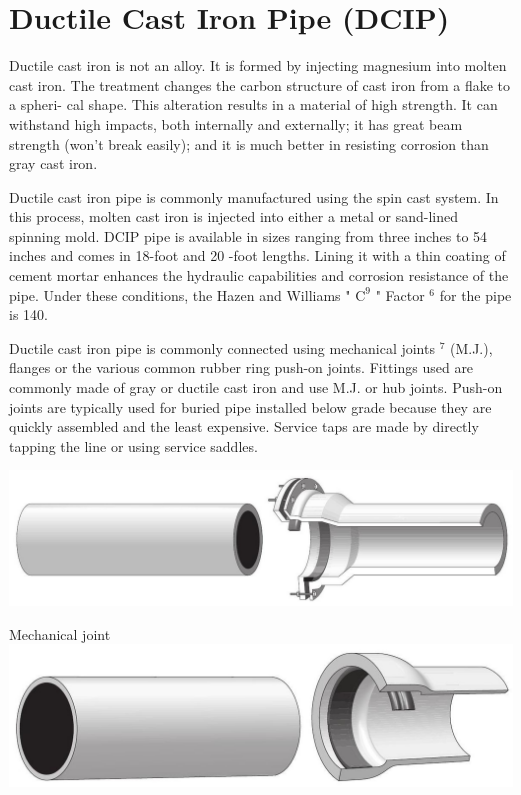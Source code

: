 \documentclass[10pt]{article}
\begin{document}
\section{Ductile Cast Iron Pipe (DCIP)}
Ductile cast iron is not an alloy. It is formed by injecting magnesium into molten cast iron. The treatment changes the carbon structure of cast iron from a flake to a spheri- cal shape. This alteration results in a material of high strength. It can withstand high impacts, both internally and externally; it has great beam strength (won't break easily); and it is much better in resisting corrosion than gray cast iron.

Ductile cast iron pipe is commonly manufactured using the spin cast system. In this process, molten cast iron is injected into either a metal or sand-lined spinning mold. DCIP pipe is available in sizes ranging from three inches to 54 inches and comes in 18-foot and 20 -foot lengths. Lining it with a thin coating of cement mortar enhances the hydraulic capabilities and corrosion resistance of the pipe. Under these conditions, the Hazen and Williams " $\mathrm{C}^{9}$ " Factor $^{6}$ for the pipe is 140.

Ductile cast iron pipe is commonly connected using mechanical joints ${ }^{7}$ (M.J.), flanges or the various common rubber ring push-on joints. Fittings used are commonly made of gray or ductile cast iron and use M.J. or hub joints. Push-on joints are typically used for buried pipe installed below grade because they are quickly assembled and the least expensive. Service taps are made by directly tapping the line or using service saddles.

\includegraphics[max width=\textwidth]{MechanicalJoint1}

Mechanical joint\\

\includegraphics[max width=\textwidth]{PushonJoint1}
\end{document}
